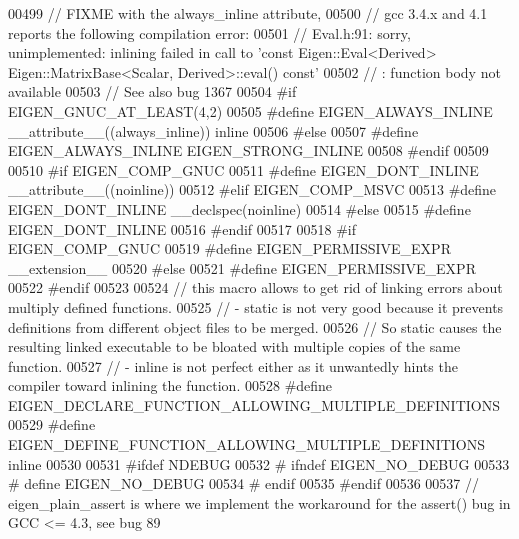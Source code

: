 \begin{DoxyCode}
00499 \textcolor{comment}{// FIXME with the always\_inline attribute,}
00500 \textcolor{comment}{// gcc 3.4.x and 4.1 reports the following compilation error:}
00501 \textcolor{comment}{//   Eval.h:91: sorry, unimplemented: inlining failed in call to 'const Eigen::Eval<Derived>
       Eigen::MatrixBase<Scalar, Derived>::eval() const'}
00502 \textcolor{comment}{//    : function body not available}
00503 \textcolor{comment}{//   See also bug 1367}
00504 \textcolor{preprocessor}{#if EIGEN\_GNUC\_AT\_LEAST(4,2)}
00505 \textcolor{preprocessor}{#define EIGEN\_ALWAYS\_INLINE \_\_attribute\_\_((always\_inline)) inline}
00506 \textcolor{preprocessor}{#else}
00507 \textcolor{preprocessor}{#define EIGEN\_ALWAYS\_INLINE EIGEN\_STRONG\_INLINE}
00508 \textcolor{preprocessor}{#endif}
00509 
00510 \textcolor{preprocessor}{#if EIGEN\_COMP\_GNUC}
00511 \textcolor{preprocessor}{#define EIGEN\_DONT\_INLINE \_\_attribute\_\_((noinline))}
00512 \textcolor{preprocessor}{#elif EIGEN\_COMP\_MSVC}
00513 \textcolor{preprocessor}{#define EIGEN\_DONT\_INLINE \_\_declspec(noinline)}
00514 \textcolor{preprocessor}{#else}
00515 \textcolor{preprocessor}{#define EIGEN\_DONT\_INLINE}
00516 \textcolor{preprocessor}{#endif}
00517 
00518 \textcolor{preprocessor}{#if EIGEN\_COMP\_GNUC}
00519 \textcolor{preprocessor}{#define EIGEN\_PERMISSIVE\_EXPR \_\_extension\_\_}
00520 \textcolor{preprocessor}{#else}
00521 \textcolor{preprocessor}{#define EIGEN\_PERMISSIVE\_EXPR}
00522 \textcolor{preprocessor}{#endif}
00523 
00524 \textcolor{comment}{// this macro allows to get rid of linking errors about multiply defined functions.}
00525 \textcolor{comment}{//  - static is not very good because it prevents definitions from different object files to be merged.}
00526 \textcolor{comment}{//           So static causes the resulting linked executable to be bloated with multiple copies of the
       same function.}
00527 \textcolor{comment}{//  - inline is not perfect either as it unwantedly hints the compiler toward inlining the function.}
00528 \textcolor{preprocessor}{#define EIGEN\_DECLARE\_FUNCTION\_ALLOWING\_MULTIPLE\_DEFINITIONS}
00529 \textcolor{preprocessor}{#define EIGEN\_DEFINE\_FUNCTION\_ALLOWING\_MULTIPLE\_DEFINITIONS inline}
00530 
00531 \textcolor{preprocessor}{#ifdef NDEBUG}
00532 \textcolor{preprocessor}{# ifndef EIGEN\_NO\_DEBUG}
00533 \textcolor{preprocessor}{#  define EIGEN\_NO\_DEBUG}
00534 \textcolor{preprocessor}{# endif}
00535 \textcolor{preprocessor}{#endif}
00536 
00537 \textcolor{comment}{// eigen\_plain\_assert is where we implement the workaround for the assert() bug in GCC <= 4.3, see bug 89}

\end{DoxyCode}

